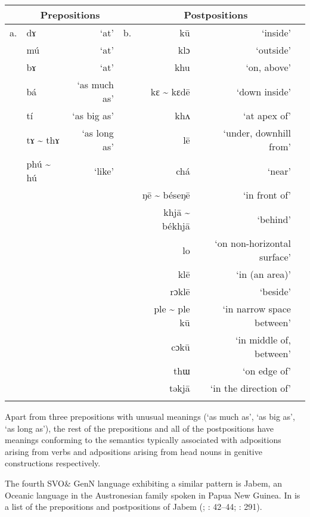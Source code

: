 \documentclass[output=paper]{langsci/langscibook}
\begin{document}
\begin{table}
\begin{tabularx}{\textwidth}{Xlrrrrr} 
\lsptoprule
  & \multicolumn{2}{c}{\bfseries Prepositions} &  & \multicolumn{2}{c}{\bfseries Postpositions}\\
\midrule
a. & dɤ & ‘at’ & b. & kū & ‘inside’\\
 & mú & ‘at’ &  & klɔ & ‘outside’\\
 & bɤ & ‘at’ &  & khu & ‘on, above’\\
 & bá & ‘as much as’ &  & kɛ {\textasciitilde} kɛdē & ‘down inside’\\
 & tí & ‘as big as’ &  & khʌ & ‘at apex of’\\
 & tɤ {\textasciitilde} thɤ & ‘as long as’ &  & lē & ‘under, downhill from’\\
 & phú {\textasciitilde} hú & ‘like’ &  & chá & ‘near’\\
 &  &  &  & ŋē {\textasciitilde} béseŋē & ‘in front of’\\
 &  &  &  & khjā {\textasciitilde} békhjā & ‘behind’\\
 &  &  &  & lo & ‘on non-horizontal surface’\\
 &  &  &  & klē & ‘in (an area)’\\
 &  &  &  & rɔklē & ‘beside’\\
 &  &  &  & ple {\textasciitilde} ple kū & ‘in narrow space between’\\
 &  &  &  & cɔkū & ‘in middle of, between’\\
 &  &  &  & thɯ & ‘on edge of’\\
 &  &  &  & təkjā & ‘in the direction of’\\
\lspbottomrule
\end{tabularx}
\end{table}


Apart from three prepositions with unusual meanings (‘as much as’, ‘as big as’, ‘as long as’), the rest of the prepositions and all of the postpositions have meanings conforming to the semantics typically associated with adpositions arising from verbs and adpositions arising from head nouns in genitive constructions respectively.

The fourth SVO\& GenN language exhibiting a similar pattern is Jabem, an Oceanic language in the Austronesian family spoken in Papua New Guinea. In  is a list of the prepositions and postpositions of Jabem (\citealt{Dempwolff1939}; \citealt{BradshawCzobor2005}: 42–44; \citealt{Ross2002}: 291).
\end{document}
